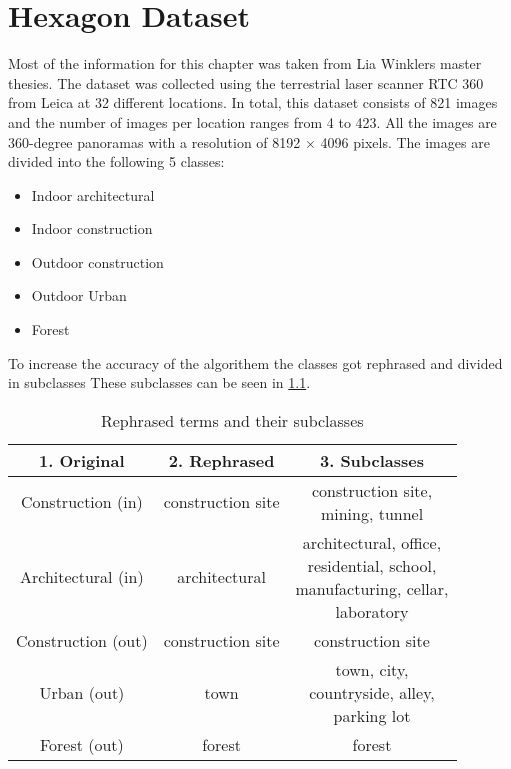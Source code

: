\chapter{Hexagon Dataset
    \label{chapter:dataset}}
Most of the information for this chapter was taken from Lia Winklers master thesies.
The dataset was collected using the terrestrial laser scanner RTC 360 from Leica at 32
different locations.
In total, this dataset consists of 821 images and the number of images per location ranges from 4 to 423.
All the images are 360-degree panoramas with a
resolution of 8192 \(\times\) 4096 pixels.
The images are divided into the following 5 classes:

\begin{itemize}
    \item Indoor architectural
    \item Indoor construction
    \item Outdoor construction
    \item Outdoor Urban
    \item Forest
\end{itemize}

\noindent
To increase the accuracy of the algorithem the classes got rephrased and divided in subclasses
These subclasses can be seen in \cref{tab:dataset:subclasses}.
\begin{table}[!ht]
    \centering
    \begin{tabular}{ccc}
    \toprule
    \textbf{1. Original}& \textbf{2. Rephrased}& \textbf{3. Subclasses}\\ \midrule
    Construction (in) & construction site & \makecell{construction site,\\ mining, tunnel}\\ \hline
    Architectural (in)& architectural& \makecell{architectural, office,\\ residential, school,\\ manufacturing, cellar,\\ laboratory} \\ \hline
    Construction (out)& construction site & construction site \\ \hline
    Urban (out)& town & \makecell{town, city,\\countryside, alley,\\ parking lot} \\ \hline
    Forest (out)& forest& forest \\
    \bottomrule
    \end{tabular}
    \caption{Rephrased terms and their subclasses
        \label{tab:dataset:subclasses}}
\end{table}

